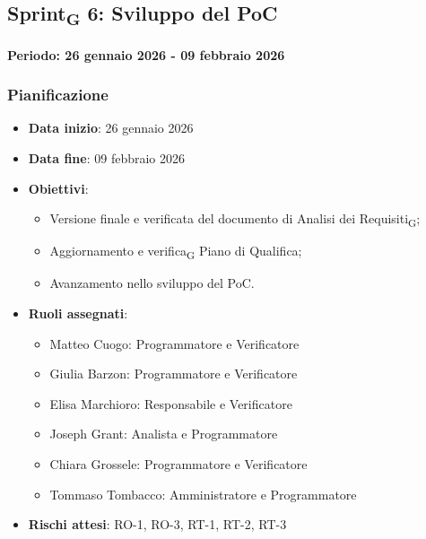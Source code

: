\documentclass[11pt,a4paper]{article}
\newcommand{\gls}[1]{#1\textsubscript{G}}
\begin{document}
\newpage
\subsection{\gls{Sprint} 6: Sviluppo del PoC}
{\textbf{Periodo: 26 gennaio 2026 - 09 febbraio 2026}\par}

\subsubsection{Pianificazione}
\begin{itemize}
    \item \textbf{Data inizio}: 26 gennaio 2026
    \item \textbf{Data fine}: 09 febbraio 2026
    \item \textbf{Obiettivi}:
    \begin{itemize}
        \item Versione finale e verificata del documento di \gls{Analisi dei Requisiti};
        \item Aggiornamento e \gls{verifica} Piano di Qualifica;
        \item Avanzamento nello sviluppo del PoC.
    \end{itemize}
    \item \textbf{Ruoli assegnati}:
    \begin{itemize}
        \item Matteo Cuogo: Programmatore e Verificatore 
        \item Giulia Barzon: Programmatore e Verificatore
        \item Elisa Marchioro: Responsabile e Verificatore
        \item Joseph Grant: Analista e Programmatore
        \item Chiara Grossele: Programmatore e Verificatore
        \item Tommaso Tombacco: Amministratore e Programmatore 
    \end{itemize}
    \item \textbf{Rischi attesi}: RO-1, RO-3, RT-1, RT-2, RT-3
\end{itemize}
\end{document}
